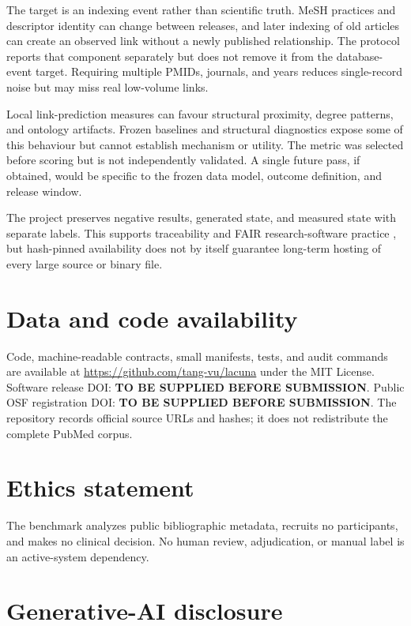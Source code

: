 \documentclass[11pt]{article}
\begin{document}
The target is an indexing event rather than scientific truth. MeSH practices and descriptor
identity can change between releases, and later indexing of old articles can create an observed
link without a newly published relationship. The protocol reports that component separately but
does not remove it from the database-event target. Requiring multiple PMIDs, journals, and years
reduces single-record noise but may miss real low-volume links.

Local link-prediction measures can favour structural proximity, degree patterns, and ontology
artifacts. Frozen baselines and structural diagnostics expose some of this behaviour but cannot
establish mechanism or utility. The metric was selected before scoring but is not independently
validated. A single future pass, if obtained, would be specific to the frozen data model, outcome
definition, and release window.

The project preserves negative results, generated state, and measured state with separate labels.
This supports traceability and FAIR research-software practice \cite{barker2022}, but hash-pinned
availability does not by itself guarantee long-term hosting of every large source or binary file.

\section*{Data and code availability}

Code, machine-readable contracts, small manifests, tests, and audit commands are available at
\url{https://github.com/tang-vu/lacuna} under the MIT License. Software release DOI:
\textbf{TO BE SUPPLIED BEFORE SUBMISSION}. Public OSF registration DOI:
\textbf{TO BE SUPPLIED BEFORE SUBMISSION}. The repository records official source URLs and hashes;
it does not redistribute the complete PubMed corpus.

\section*{Ethics statement}

The benchmark analyzes public bibliographic metadata, recruits no participants, and makes no
clinical decision. No human review, adjudication, or manual label is an active-system dependency.

\section*{Generative-AI disclosure}
\end{document}
